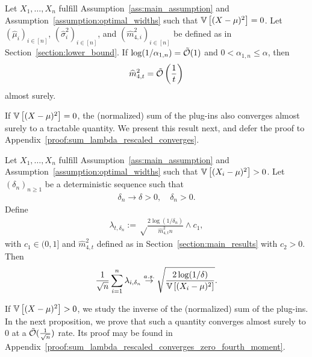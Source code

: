 \begin{proposition} \label{proposition:zero_fourth_moment_scales_as_one_over_lower_bound}
    Let $X_1, \ldots, X_n$ fulfill Assumption~\ref{ass:main_assumption} and Assumption~\ref{assumption:optimal_widths} such that $\mathbb{V} \left[(X-\mu)^2 \right] = 0$. Let $(\widehat\mu_i)_{i \in [n]}$, $(\widehat\sigma_i^2)_{i \in [n]}$, and $(\widehat m_{4, i}^2)_{i \in [n]}$  be defined as in Section~\ref{section:lower_bound}. If  $\log (1 / \alpha_{1, n}) = \tilde{\mathcal{O}}(1)$ and $0 < \alpha_{1, n} \leq \alpha$, then
    \begin{align*}
        \widehat m_{4, t}^2 = \tilde{\mathcal{O}} \left( \frac{1}{t}\right)
    \end{align*}
    almost surely.
\end{proposition}

If $\mathbb{V} \left[(X-\mu)^2 \right] = 0$, the (normalized) sum of the plug-ins also converges almost surely to a tractable quantity. We present this result next, and defer the proof to Appendix~\ref{proof:sum_lambda_rescaled_converges}.

\begin{proposition} \label{proposition:sum_lambda_rescaled_converges}
    Let $X_1, \ldots, X_n$ fulfill Assumption~\ref{ass:main_assumption} and Assumption~\ref{assumption:optimal_widths} such that $\mathbb{V} \left[ (X_i-\mu)^2\right] > 0$. Let $(\delta_n)_{n \geq 1}$ be a deterministic sequence such that
    \begin{align*}
        \delta_n \to \delta > 0, \quad \delta_n >0.
    \end{align*}
    Define
    \begin{align*}
        \lambda_{t,\delta_n} := \sqrt\frac{2\log(1/\delta_n)}{\widehat m_{4, t}^2 n} \wedge c_1,
    \end{align*}
    with $c_1 \in (0, 1]$ and $\widehat m_{4, t}^2$ defined as in Section~\ref{section:main_results} with $c_2 > 0$. Then
    \begin{align*}
        \frac{1}{\sqrt{n}} \sum_{i = 1}^n \lambda_{i,\delta_n} \stackrel{a.s.}{\to} \sqrt \frac{2 \log (1 / \delta)}{\mathbb{V} \left[ (X_i-\mu)^2\right]}.
    \end{align*}
\end{proposition}

If $\mathbb{V} \left[(X-\mu)^2 \right] > 0$, we study the inverse of the (normalized) sum of the plug-ins. In the next proposition, we prove that such a quantity converges almost surely to $0$ at a $\tilde {\mathcal{O}} ( \frac{1}{\sqrt n} )$ rate.  Its proof may be found in Appendix~\ref{proof:sum_lambda_rescaled_converges_zero_fourth_moment}.

